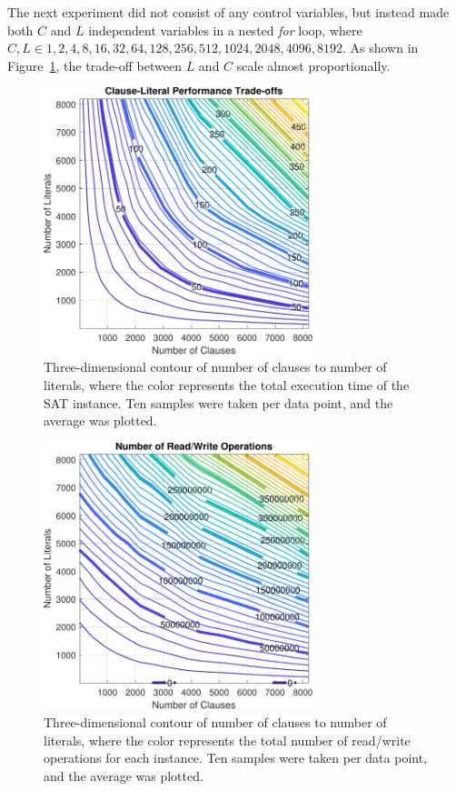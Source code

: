 \documentclass[runningheads]{llncs}
\begin{document}
The next experiment did not consist of any control variables, but instead  made both $C$ and $L$ independent variables in a nested \emph{for} loop, where $C, L \in {1, 2, 4, 8, 16, 32, 64, 128, 256, 512, 1024, 2048, 4096, 8192}$. As shown in Figure~\ref{fig:clause_literal}, the trade-off between $L$ and $C$ scale almost proportionally.

\begin{figure}[h]
    \centering
    \includegraphics[width=0.7\textwidth]{Figures/clause_literal.pdf}
    \caption{Three-dimensional contour of number of clauses to number of literals, where the color represents the total execution time of the SAT instance. Ten samples were taken per data point, and the average was plotted.}
    \label{fig:clause_literal}
\end{figure}


\begin{figure}[h]
    \centering
    \includegraphics[width=0.7\textwidth]{Figures/num_operations.pdf}
    \caption{Three-dimensional contour of number of clauses to number of literals, where the color represents the total number of read/write operations for each instance. Ten samples were taken per data point, and the average was plotted.}
    \label{fig:num_operations}
\end{figure}
\end{document}
